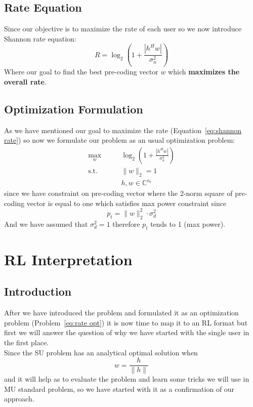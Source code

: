 \subsection{Rate Equation}
Since our objective is to maximize the rate of each user so we now introduce Shannon rate equation:
\begin{equation}
    \label{eq:shannon rate}
    R = \log_2 \left( 1 + \frac{| h^H w |}{ \sigma^2_n } \right)
\end{equation}
Where our goal to find the best pre-coding vector $w$ which \textbf{maximizes the overall rate}.

\subsection{Optimization Formulation}
As we have mentioned our goal to maximize the rate (Equation~\ref{eq:shannon rate}) so now we formulate our problem as an usual optimization problem:
\begin{equation}
    \label{eq:rate opt}
    \begin{aligned}
        \max_w \qquad & \log_2 \left( 1 + \frac{| h^H w |}{ \sigma^2_n } \right) \\
        \text{s.t.} \qquad & \|w\|_2 = 1 \\
        & h, w \in \mathbb{C}^{n_t}
    \end{aligned}
\end{equation}
since we have constraint on pre-coding vector where the 2-norm square of pre-coding vector is equal to one which satisfies max power constraint since
\[ p_t = \|w\|^2_2 \cdot \sigma^2_d \]
And we have assumed that $\sigma^2_d = 1$ therefore $p_t$ tends to 1 (max power).

\section{RL Interpretation}
\subsection{Introduction}
After we have introduced the problem and formulated it as an optimization problem (Problem~\ref{eq:rate opt}) it is now time
to map it to an RL format but first we will answer the question of why we have started with the single user in the first place.\\
Since the SU problem has an analytical optimal solution when \[ w=\frac{h}{\|h\|} \] and it will help as to evaluate the problem and learn some tricks we will use in MU standard problem, so we have started with it as a confirmation of our approach.

